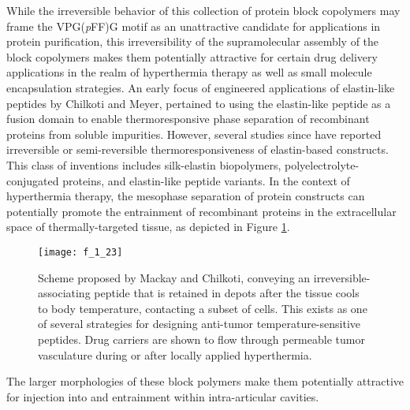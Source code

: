 \begin{refsection}
While the irreversible behavior of this collection of protein block copolymers
may frame the VPG(\emph{p}FF)G motif as an unattractive candidate for
applications in protein purification, this irreversibility of the supramolecular
assembly of the block copolymers makes them potentially attractive for certain drug delivery
applications in the realm of hyperthermia therapy as well as small molecule
encapsulation strategies. An early focus of engineered applications of 
elastin-like peptides by Chilkoti and Meyer, pertained to 
using the elastin-like peptide as a fusion domain to enable thermoresponsive
phase separation of recombinant proteins from soluble
impurities.\cite{Meyer1999,Meyer2001} However, several studies since have reported
irreversible or semi-reversible thermoresponsiveness of elastin-based
constructs. This class of inventions includes silk-elastin biopolymers,
polyelectrolyte-conjugated proteins, and elastin-like peptide
variants.\cite{Herrero-Vanrell2005,Megeed2002,Kayitmazer2007} In the context of
hyperthermia therapy, the mesophase separation of protein constructs can
potentially promote the entrainment of recombinant proteins in the extracellular
space of thermally-targeted tissue, as depicted in Figure
\ref{fig:irreversible_delivery}.
\begin{figure}[h!] \centering \texttt{[image: f\_1\_23]}
    \caption[Scheme proposed by Mackay and Chilkoti, conveying an
        irreversible-associating peptide that is retained in depots after the
        tissue cools to body temperature, contacting a subset of cells. This
        exists as one of several strategies for designing anti-tumor
        temperature-sensitive peptides. Drug carriers are shown to flow through
    permeable tumor vasculature during or after locally applied
hyperthermia.]{Scheme proposed by Mackay and Chilkoti,\cite{Mackay2008}
conveying an irreversible-associating peptide that is retained in depots after
the tissue cools to body temperature, contacting a subset of cells. This exists
as one of several strategies for designing anti-tumor temperature-sensitive
peptides. Drug carriers are shown to flow through permeable tumor vasculature
during or after locally applied hyperthermia.} \label{fig:irreversible_delivery} \end{figure}
The larger morphologies of these block polymers make them potentially attractive
for injection into and entrainment within intra-articular cavities.\cite{Nettles2008,Betre2006a} 


\end{refsection}

